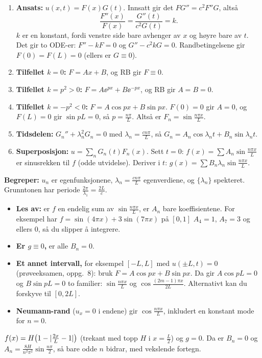 \begin{oppskrift}
\begin{enumerate}
  \item \textbf{Ansats:} $u(x,t)=F(x)G(t)$. Innsatt gir det $FG''=c^2F''G$, altså
  \[
  \frac{F''(x)}{F(x)}=\frac{G''(t)}{c^2G(t)}=k .
  \]
  $k$ er en konstant, fordi venstre side bare avhenger av $x$ og høyre bare av $t$.
  Det gir to ODE-er: $F''-kF=0$ og $G''-c^2kG=0$. Randbetingelsene gir $F(0)=F(L)=0$ (ellers er $G\equiv0$).
  \item \textbf{Tilfellet $k=0$:} $F=Ax+B$, og RB gir $F\equiv0$.
  \item \textbf{Tilfellet $k=p^2>0$:} $F=A\ee^{px}+B\ee^{-px}$, og RB gir $A=B=0$.
  \item \textbf{Tilfellet $k=-p^2<0$:} $F=A\cos px+B\sin px$. $F(0)=0$ gir $A=0$, og $F(L)=0$ gir $\sin pL=0$, så $p=\frac{n\pi}L$. Altså er $F_n=\sin\frac{n\pi x}L$.
  \item \textbf{Tidsdelen:} $G_n''+\lambda_n^2G_n=0$ med $\lambda_n=\frac{cn\pi}L$, så $G_n=A_n\cos\lambda_nt+B_n\sin\lambda_nt$.
  \item \textbf{Superposisjon:} $u=\sum_nG_n(t)F_n(x)$. Sett $t=0$: $f(x)=\sum A_n\sin\frac{n\pi x}L$ er sinusrekken til $f$ (odde utvidelse). Deriver i $t$: $g(x)=\sum B_n\lambda_n\sin\frac{n\pi x}L$.
\end{enumerate}
\textbf{Begreper:} $u_n$ er egenfunksjonene, $\lambda_n=\frac{cn\pi}L$ egenverdiene, og $\{\lambda_n\}$ spekteret. Grunntonen har periode $\frac{2\pi}{\lambda_1}=\frac{2L}c$.
\end{oppskrift}

\begin{fallgruve}
\begin{itemize}
  \item \textbf{Les av:} er $f$ en endelig sum av $\sin\frac{n\pi x}L$, er $A_n$ bare koeffisientene. For eksempel har $f=\sin(4\pi x)+3\sin(7\pi x)$ på $[0,1]$ $A_4=1$, $A_7=3$ og ellers $0$, så du slipper å integrere.
  \item \textbf{Er $g\equiv0$,} er alle $B_n=0$.
  \item \textbf{Et annet intervall,} for eksempel $[-L,L]$ med $u(\pm L,t)=0$ (prøveeksamen, oppg.~8): bruk $F=A\cos px+B\sin px$. Da gir $A\cos pL=0$ og $B\sin pL=0$ to familier: $\sin\frac{n\pi x}L$ og $\cos\frac{(2m-1)\pi x}{2L}$. Alternativt kan du forskyve til $[0,2L]$.
  \item \textbf{Neumann-rand} ($u_x=0$ i endene) gir $\cos\frac{n\pi x}L$, inkludert en konstant mode for $n=0$.
\end{itemize}
\end{fallgruve}

\begin{eksempel}
$f(x)=H\bigl(1-\lvert \frac{2x}L-1\rvert\bigr)$ (trekant med topp $H$ i $x=\frac L2$) og $g=0$. Da er $B_n=0$ og $A_n=\frac{8H}{n^2\pi^2}\sin\frac{n\pi}{2}$, så bare odde $n$ bidrar, med vekslende fortegn.
\end{eksempel}


